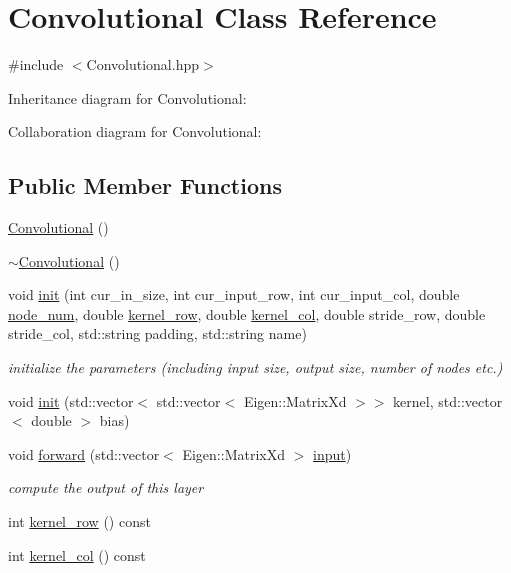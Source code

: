 \hypertarget{class_convolutional}{}\section{Convolutional Class Reference}
\label{class_convolutional}


{\ttfamily \#include $<$Convolutional.\+hpp$>$}



Inheritance diagram for Convolutional\+:


Collaboration diagram for Convolutional\+:
\subsection*{Public Member Functions}
\begin{DoxyCompactItemize}
\item 
\hyperlink{class_convolutional_adda39e974f455ea0fd2758b6b020aabc}{Convolutional} ()
\item 
\hyperlink{class_convolutional_a106274399705e27f3afb1a896907d2bf}{$\sim$\+Convolutional} ()
\item 
void \hyperlink{class_convolutional_a40c5772cf002e82be65a03547042c828}{init} (int cur\+\_\+in\+\_\+size, int cur\+\_\+input\+\_\+row, int cur\+\_\+input\+\_\+col, double \hyperlink{class_layer_a2f19878482d098654fb084b9c21b72ed}{node\+\_\+num}, double \hyperlink{class_convolutional_aa298488e132540e32e8f41e10a33503f}{kernel\+\_\+row}, double \hyperlink{class_convolutional_a6970108a6579ab0def8e4faac59023ca}{kernel\+\_\+col}, double stride\+\_\+row, double stride\+\_\+col, std\+::string padding, std\+::string name)
\begin{DoxyCompactList}\small\item\em initialize the parameters (including input size, output size, number of nodes etc.) \end{DoxyCompactList}\item 
void \hyperlink{class_convolutional_af5b6f0726d5f7d0c8e4122e3e32a3abb}{init} (std\+::vector$<$ std\+::vector$<$ Eigen\+::\+Matrix\+Xd $>$$>$ kernel, std\+::vector$<$ double $>$ bias)
\item 
void \hyperlink{class_convolutional_ae52748139bd1a17a77525290086d8ad8}{forward} (std\+::vector$<$ Eigen\+::\+Matrix\+Xd $>$ \hyperlink{class_layer_a5213366d9a5a7317c5d40d9efdcfa623}{input})
\begin{DoxyCompactList}\small\item\em compute the output of this layer \end{DoxyCompactList}\item 
int \hyperlink{class_convolutional_aa298488e132540e32e8f41e10a33503f}{kernel\+\_\+row} () const
\item 
int \hyperlink{class_convolutional_a6970108a6579ab0def8e4faac59023ca}{kernel\+\_\+col} () const
\end{DoxyCompactItemize}
